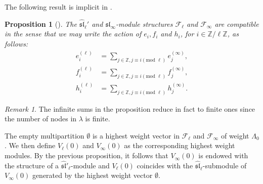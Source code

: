 \documentclass[12pt]{amsart}
\numberwithin{itemcounter}{subsection}
\theoremstyle{plain}
\newtheorem{proposition}[theorem]{Proposition}
\theoremstyle{definition}
\theoremstyle{remark}
\newtheorem{remark}[theorem]{Remark}
\numberwithin{equation}{section}
\begin{document}
									The following result is implicit in \cite[Proposition~3.5]{Ug99}.

									\begin{proposition}[\cite{Ug99}]
										\label{Prop_compa_action}The $\widehat{\mathfrak
											{sl}}_{\ell}'$ and $\mathfrak{sl}_{\infty}$-module
										structures $\mathcal{F}_{\ell}$ and $\mathcal{F}_{\infty
										}$ are compatible in the sense that we may write
										the action of $e_{i}, f_{i}$ and $h_{i}$, for $i\in\mathbb{Z}/\ell\mathbb{Z}$, as follows:
										\begin{align*}
											e^{(\ell)}_{i} &  =\sum_{j\in\mathbb{Z},j\equiv i(\text{mod }\ell)}  e^{(\infty)}_{j},\\
											f^{(\ell)}_{i} &  =\sum_{j\in\mathbb{Z},j\equiv i(\text{mod }\ell)} f^{(\infty)}_{j},\\
											h^{(\ell)}_{i} &  =\sum_{j\in\mathbb{Z},j\equiv i(\text{mod }\ell)}h^{(\infty)}_{j}.
										\end{align*}
									\end{proposition}

									\begin{remark}
										The infinite sums in the proposition reduce in fact to
										finite ones since the number of nodes in ${\lambda}$ is finite.
									\end{remark}

									The empty multipartition $\mathbf{\emptyset}$ is a highest weight vector in
									$\mathcal{F}_{\ell}$ and $\mathcal{F}_{\infty}$ of
									weight $\Lambda_{0}$. We
									then define $V_{\ell}(0)$ and $V_{\infty}(0)$ as the corresponding
									highest weight modules.
									By the previous proposition,
									it follows that $V_{\infty}(0)$ is endowed
									with the structure of a
									$\widehat{\mathfrak{sl}}'_{\ell}$-module and
									$V_{\ell}(0)$ coincides with the $\widehat{\mathfrak{sl}}_{\ell}$-submodule of $V_{\infty
									}(0)$ generated by the highest weight vector $\mathbf{\emptyset}$.
\end{document}
